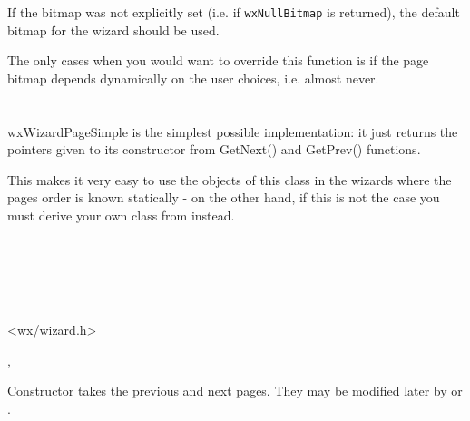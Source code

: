 If the bitmap was not explicitly set (i.e. if {\tt wxNullBitmap} is returned),
the default bitmap for the wizard should be used.

The only cases when you would want to override this function is if the page
bitmap depends dynamically on the user choices, i.e. almost never.


\section{}\label{wxwizardpagesimple}

wxWizardPageSimple is the simplest possible 
 implementation: it just returns the
pointers given to its constructor from GetNext() and GetPrev() functions.

This makes it very easy to use the objects of this class in the wizards where
the pages order is known statically - on the other hand, if this is not the
case you must derive your own class from  
instead.


\\
\\
\\
\\


<wx/wizard.h>


, 


\label{wxwizardpagesimplewxwizardpagesimple}


Constructor takes the previous and next pages. They may be modified later by
 or 
.

